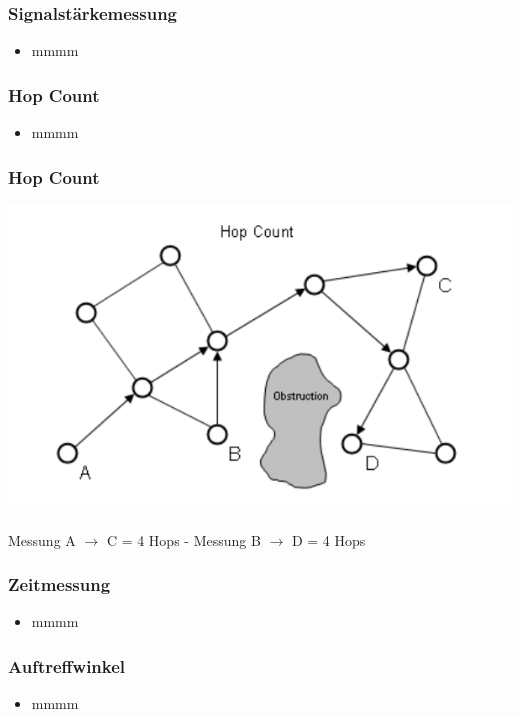\begin{frame}
\frametitle{Signalstärkemessung}

\begin{itemize}
  \item mmmm
\end{itemize}
\end{frame}

\begin{frame}
\frametitle{Hop Count}

\begin{itemize}
  \item mmmm
\end{itemize}
\end{frame}

\begin{frame}
  \frametitle{Hop Count}

  \begin{center}
  \includegraphics[scale=0.5]{img/hop_count1}
  \\~\\
  Messung A $\to$ C = 4 Hops - Messung B $\to$ D = 4 Hops
  \end{center}
\end{frame}

\begin{frame}
\frametitle{Zeitmessung}

\begin{itemize}
  \item mmmm
\end{itemize}
\end{frame}

\begin{frame}
\frametitle{Auftreffwinkel}

\begin{itemize}
  \item mmmm
\end{itemize}
\end{frame}
